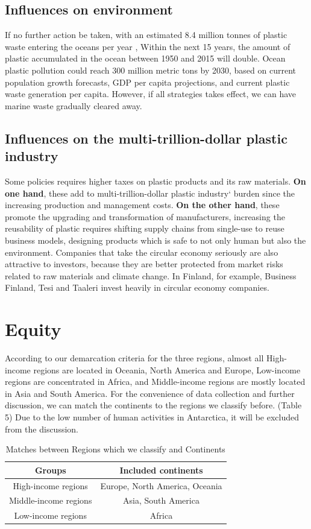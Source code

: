 \documentclass{mcmthesis}
\begin{document}
	 \subsection{Influences on environment}
	 If no further action be taken, with an estimated 8.4 million tonnes of plastic waste entering the oceans per year \cite{jambeck2015plastic}, Within the next 15 years, 
	  the amount of plastic accumulated in the ocean between 1950 and 2015 will double. Ocean plastic pollution could reach 300 million metric tons by 2030, based on 
	 current population growth forecasts, GDP per capita 
	 projections, and current plastic waste generation per 
	 capita.\cite{WWFReport}
	 However, if all strategies takes effect, we can have marine waste gradually cleared away.
	  \subsection{Influences on the multi-trillion-dollar plastic industry}
	  Some policies requires higher taxes on plastic products and its raw materials. \textbf{On one hand}, these add to multi-trillion-dollar plastic industry‘ burden since the increasing production and management costs. \textbf{On the other hand}, these  promote the upgrading and transformation of manufacturers, increasing the reusability of plastic requires shifting supply chains from single-use to reuse business models, designing products which is safe to not only human but also the environment.  
	  Companies that take the circular economy seriously are also attractive to investors, because they are better protected from market risks related to raw materials and climate change. In Finland, for example, Business Finland, Tesi and Taaleri invest heavily in circular economy companies.\cite {Heikki2019circueco}
	 
\section{Equity}
     According to our demarcation criteria for the three regions, almost all High-income regions are located in Oceania, North America and Europe, Low-income regions are concentrated in Africa, and Middle-income regions are mostly located in Asia and South America. For the convenience of data collection and further discussion, we can match the continents to the regions we classify before. (Table 5) Due to the low number of human activities in Antarctica, it will be excluded from the discussion.
	 
	 \begin{table}[H]
		\renewcommand\arraystretch{1.6}
		\centering
		 \caption{Matches between Regions which we classify and Continents }
	   \begin{tabular}{|c|c|}%
		  \hline
		  Groups&Included continents\\
		  \hline
		  High-income regions&Europe, North America, Oceania\\
		  \hline
		  Middle-income regions&Asia, South America\\
		  \hline
		  Low-income regions&Africa\\
		  \hline
		  \end{tabular}
	  \end{table}
  
\end{document}
